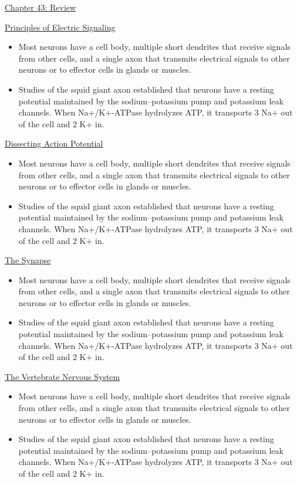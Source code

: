 \documentclass[12pt,letterpaper]{article}
\begin{document}
\hypertarget{43.r}{}
\begin{probbox}{\hyperlink{43}{Chapter 43: Review}}\end{probbox}
    \vspace{12pt}
    \hyperlink{43.1}{Principles of Electric Signaling}
    \begin{itemize} 
        \item Most neurons have a cell body, multiple short dendrites that receive signals from other cells, and a single axon that transmits electrical signals to other neurons or to effector cells in glands or muscles. 
        \item Studies of the squid giant axon established that neurons have a resting potential maintained by the sodium–potassium pump and potassium leak channels. When Na+/K+-ATPase hydrolyzes ATP, it transports 3 Na+ out of the cell and 2 K+ in.
    \end{itemize}
    \hyperlink{43.2}{Dissecting Action Potential}
    \begin{itemize}
        \item Most neurons have a cell body, multiple short dendrites that receive signals from other cells, and a single axon that transmits electrical signals to other neurons or to effector cells in glands or muscles. 
        \item Studies of the squid giant axon established that neurons have a resting potential maintained by the sodium–potassium pump and potassium leak channels. When Na+/K+-ATPase hydrolyzes ATP, it transports 3 Na+ out of the cell and 2 K+ in.     
    \end{itemize}
    \hyperlink{43.3}{The Synapse}
    \begin{itemize}
        \item Most neurons have a cell body, multiple short dendrites that receive signals from other cells, and a single axon that transmits electrical signals to other neurons or to effector cells in glands or muscles. 
        \item Studies of the squid giant axon established that neurons have a resting potential maintained by the sodium–potassium pump and potassium leak channels. When Na+/K+-ATPase hydrolyzes ATP, it transports 3 Na+ out of the cell and 2 K+ in.
    \end{itemize}
    \hyperlink{43.4}{The Vertebrate Nervous System}
    \begin{itemize}
        \item Most neurons have a cell body, multiple short dendrites that receive signals from other cells, and a single axon that transmits electrical signals to other neurons or to effector cells in glands or muscles. 
        \item Studies of the squid giant axon established that neurons have a resting potential maintained by the sodium–potassium pump and potassium leak channels. When Na+/K+-ATPase hydrolyzes ATP, it transports 3 Na+ out of the cell and 2 K+ in.
    \end{itemize}

 
\end{document}
